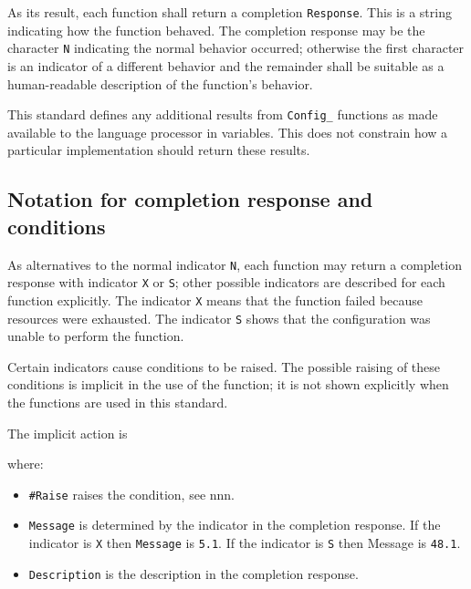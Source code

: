 As its result, each function shall return a completion
\texttt{Response}. This is a string indicating how the function behaved.
The completion response may be the character
\texttt{\textquotesingle{}N\textquotesingle{}} indicating the normal
behavior occurred; otherwise the first character is an indicator of a
different behavior and the remainder shall be suitable as a
human-readable description of the function's behavior.

This standard defines any additional results from \texttt{Config\_}
functions as made available to the language processor in variables. This
does not constrain how a particular implementation should return these
results.

\subsection{Notation for completion response and
conditions}\label{notation-for-completion-response-and-conditions}

As alternatives to the normal indicator
\texttt{\textquotesingle{}N\textquotesingle{}}, each function may return
a completion response with indicator
\texttt{\textquotesingle{}X\textquotesingle{}} or
\texttt{\textquotesingle{}S\textquotesingle{}}; other possible
indicators are described for each function explicitly. The indicator
\texttt{\textquotesingle{}X\textquotesingle{}} means that the function
failed because resources were exhausted. The indicator
\texttt{\textquotesingle{}S\textquotesingle{}} shows that the
configuration was unable to perform the function.

Certain indicators cause conditions to be raised. The possible raising
of these conditions is implicit in the use of the function; it is not
shown explicitly when the functions are used in this standard.

The implicit action is



where:

\begin{itemize}
\tightlist
\item
  \texttt{\#Raise} raises the condition, see nnn.
\item
  \texttt{Message} is determined by the indicator in the completion
  response. If the indicator is
  \texttt{\textquotesingle{}X\textquotesingle{}} then \texttt{Message}
  is \texttt{5.1}. If the indicator is
  \texttt{\textquotesingle{}S\textquotesingle{}} then Message is
  \texttt{48.1}.
\item
  \texttt{Description} is the description in the completion response.
\end{itemize}

